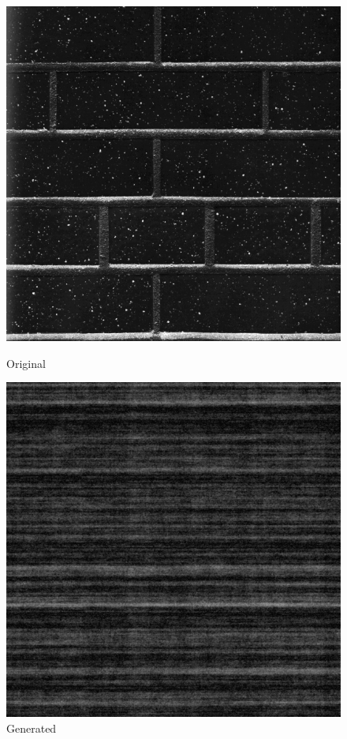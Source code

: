 \documentclass{article}
\begin{document}
\pagebreak

    \begin{figure}[!htb]
    \begin{center}
      \includegraphics[scale=.3]{5/report/random/5.png}
      \caption{Original}
    \end{center}
    \endminipage \hfill
    \begin{center}
      \includegraphics[scale=.3]{5/report/random/5_c.png}
      \caption{Generated}
    \end{center}
    \endminipage
    \end{figure}
\end{document}
